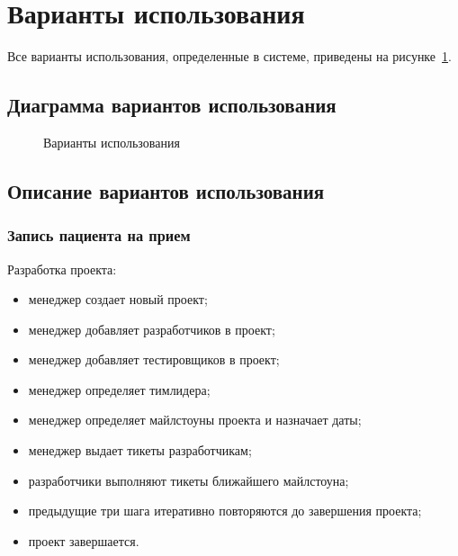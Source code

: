 \section{Варианты использования}
Все варианты использования, определенные в системе, приведены на рисунке~\ref{fig:useCases}.
	\subsection{Диаграмма вариантов использования}
		\begin{figure}[h]
			\caption{Варианты использования}
			\label{fig:useCases}
		\end{figure}
	
	\subsection{Описание вариантов использования}
		\subsubsection{Запись пациента на прием}
			Разработка проекта:
			\begin{itemize}
				\item менеджер создает новый проект;
				\item менеджер добавляет разработчиков в проект;
				\item менеджер добавляет тестировщиков в проект;
				\item менеджер определяет тимлидера;
				\item менеджер определяет майлстоуны проекта и назначает даты;
				\item менеджер выдает тикеты разработчикам;
				\item разработчики выполняют тикеты ближайшего майлстоуна;
				\item предыдущие три шага итеративно повторяются до завершения проекта;
				\item проект завершается.
			\end{itemize}
			
